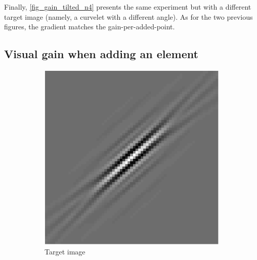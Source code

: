 \noindent
Finally, \cref{fig_gain_tilted_n4} presents the same experiment but with a different target image (namely, a curvelet with a different angle). As for the two previous figures, the gradient matches the gain-per-added-point.

\subsection{Visual gain when adding an element}

\begin{figure}[!h]\centering
\begin{subfigure}[b]{0.32\linewidth}\centering
\includegraphics[width=\linewidth]{figures/before_after/xp_128x128_sc2_angl1_K3_S3_node4before_target.pdf}
	\caption{Target image}\label{fig_beforeafter-target}
\end{subfigure}
\begin{subfigure}[b]{0.32\linewidth}\centering

\end{subfigure}
\end{figure}
